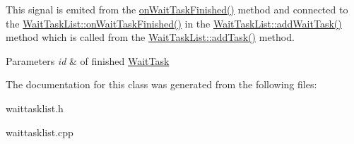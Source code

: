 This signal is emited from the \hyperlink{class_waiting_task_a93e5b1b87723904e6a4babef1bbd4727}{on\+Wait\+Task\+Finished()} method and connected to the \hyperlink{class_wait_task_list_ab6c3634d0739c8948b028c8db86d804c}{Wait\+Task\+List\+::on\+Wait\+Task\+Finished()} in the \hyperlink{class_wait_task_list_a2724cb9d9e7f897a4bf0c44054ad2c29}{Wait\+Task\+List\+::add\+Wait\+Task()} method which is called from the \hyperlink{class_wait_task_list_a429d0b45f82a2eef00c5dacffbbc1f70}{Wait\+Task\+List\+::add\+Task()} method. 


\begin{DoxyParams}{Parameters}
{\em id} & of finished \hyperlink{class_wait_task}{Wait\+Task} \\
\hline
\end{DoxyParams}


The documentation for this class was generated from the following files\+:\begin{DoxyCompactItemize}
\item 
waittasklist.\+h\item 
waittasklist.\+cpp\end{DoxyCompactItemize}
